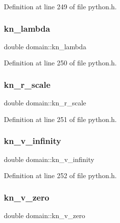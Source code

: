 Definition at line 249 of file python.\+h.

\mbox{\label{structdomain_ada92cbd729106e55d48e8a6ae5b8c7c2}} 
\subsubsection{\texorpdfstring{kn\+\_\+lambda}{kn\_lambda}}
{\footnotesize\ttfamily double domain\+::kn\+\_\+lambda}



Definition at line 250 of file python.\+h.

\mbox{\label{structdomain_a62fd3473a4d70f61e2db3c7d5e457db0}} 
\subsubsection{\texorpdfstring{kn\+\_\+r\+\_\+scale}{kn\_r\_scale}}
{\footnotesize\ttfamily double domain\+::kn\+\_\+r\+\_\+scale}



Definition at line 251 of file python.\+h.

\mbox{\label{structdomain_aa7f0bbf95881b4cc4090150669bbf806}} 
\subsubsection{\texorpdfstring{kn\+\_\+v\+\_\+infinity}{kn\_v\_infinity}}
{\footnotesize\ttfamily double domain\+::kn\+\_\+v\+\_\+infinity}



Definition at line 252 of file python.\+h.

\mbox{\label{structdomain_adb9f726942f3f24572729b1ff144b8c2}} 
\subsubsection{\texorpdfstring{kn\+\_\+v\+\_\+zero}{kn\_v\_zero}}
{\footnotesize\ttfamily double domain\+::kn\+\_\+v\+\_\+zero}



